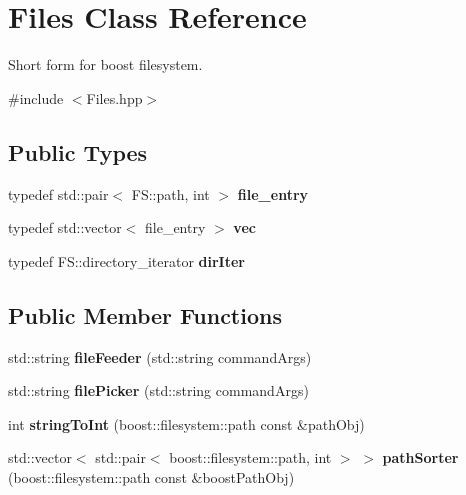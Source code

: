 \hypertarget{classFiles}{}\section{Files Class Reference}
\label{classFiles}


Short form for boost filesystem.  




{\ttfamily \#include $<$Files.\+hpp$>$}

\subsection*{Public Types}
\begin{DoxyCompactItemize}
\item 
typedef std\+::pair$<$ F\+S\+::path, int $>$ {\bfseries file\+\_\+entry}\hypertarget{classFiles_af0fd316c7cb5e341101d3e769e07e226}{}\label{classFiles_af0fd316c7cb5e341101d3e769e07e226}

\item 
typedef std\+::vector$<$ file\+\_\+entry $>$ {\bfseries vec}\hypertarget{classFiles_ae6f3fc111b3196bb04d8adb2aaaf33ce}{}\label{classFiles_ae6f3fc111b3196bb04d8adb2aaaf33ce}

\item 
typedef F\+S\+::directory\+\_\+iterator {\bfseries dir\+Iter}\hypertarget{classFiles_a4e46d3aa461a4bd96b1f869654047145}{}\label{classFiles_a4e46d3aa461a4bd96b1f869654047145}

\end{DoxyCompactItemize}
\subsection*{Public Member Functions}
\begin{DoxyCompactItemize}
\item 
std\+::string {\bfseries file\+Feeder} (std\+::string command\+Args)\hypertarget{classFiles_a597d23868ac4f38ee025e366718e5ab7}{}\label{classFiles_a597d23868ac4f38ee025e366718e5ab7}

\item 
std\+::string {\bfseries file\+Picker} (std\+::string command\+Args)\hypertarget{classFiles_a4ae09770763498a9d5c044286ae484bd}{}\label{classFiles_a4ae09770763498a9d5c044286ae484bd}

\item 
int {\bfseries string\+To\+Int} (boost\+::filesystem\+::path const \&path\+Obj)\hypertarget{classFiles_aa11b83f38d009ed95cda22f65fb883ba}{}\label{classFiles_aa11b83f38d009ed95cda22f65fb883ba}

\item 
std\+::vector$<$ std\+::pair$<$ boost\+::filesystem\+::path, int $>$ $>$ {\bfseries path\+Sorter} (boost\+::filesystem\+::path const \&boost\+Path\+Obj)\hypertarget{classFiles_a25c46a9249f9bc496f0f4e82662cc25a}{}\label{classFiles_a25c46a9249f9bc496f0f4e82662cc25a}

\end{DoxyCompactItemize}


